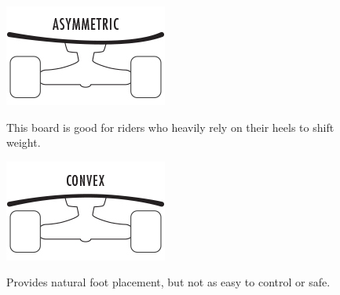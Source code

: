 \documentclass[letterpaper,12pt]{article}
\begin{document}
\begin{itemize}
\begin{figure}[!htbp]\centering
\begin{minipage}{.5\textwidth}\centering
\includegraphics[width=.8\textwidth]{asymmetric.jpg}
\label{asymmetric}
\end{minipage}
\item This board is good for riders who heavily rely on their heels to shift weight.
\end{figure}

\begin{figure}[!htbp]\centering
\begin{minipage}{.5\textwidth}\centering
\includegraphics[width=.8\textwidth]{convex.jpg}
\label{convex}
\end{minipage}
\item Provides natural foot placement, but not as easy to control or safe.
\end{figure}


\end{itemize}
\end{document}
